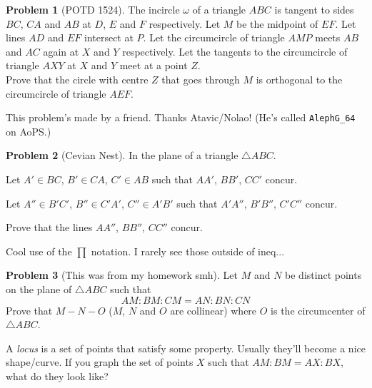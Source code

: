 \documentclass[11pt]{article} %
\theoremstyle{definition}
\newtheorem{problem}{Problem}
\theoremstyle{remark}
\begin{document}
\begin{problem}[POTD 1524]
    The incircle \(\omega\) of a triangle \(ABC\) is tangent to sides \(BC\), \(CA\) and \(AB\) at \(D\), \(E\) and \(F\) respectively. Let \(M\) be the midpoint of \(EF\). Let lines \(AD\) and \(EF\) intersect at \(P\). Let the circumcircle of triangle \(AMP\) meets \(AB\) and \(AC\) again at \(X\) and \(Y\) respectively. Let the tangents to the circumcircle of triangle \(AXY\) at \(X\) and \(Y\) meet at a point \(Z\).
    \\ Prove that the circle with centre \(Z\) that goes through \(M\) is orthogonal to the circumcircle of triangle \(AEF\).
    \begin{talks}
        \begin{talk}
            This problem's made by a friend. Thanks Atavic/Nolao! (He's called \verb|AlephG_64| on AoPS.)
        \end{talk}
    \end{talks}
\end{problem}

\begin{problem}[Cevian Nest]
    In the plane of a triangle \(\triangle ABC\).

    Let \(A' \in BC\), \(B' \in CA\), \(C' \in AB\) such that \(AA'\), \(BB'\), \(CC'\) concur.

    Let \(A'' \in B'C'\), \(B'' \in C'A'\), \(C'' \in A'B'\) such that \(A'A''\), \(B'B''\), \(C'C''\) concur.

    Prove that the lines \(AA''\), \(BB''\), \(CC''\) concur.
    \begin{talks}
        \begin{talk}
            Cool use of the \(\prod\) notation. I rarely see those outside of ineq...
        \end{talk}
    \end{talks}
\end{problem}

\begin{problem}[This was from my homework smh]
    Let \(M\) and \(N\) be distinct points on the plane of \(\triangle ABC\) such that
    \[AM : BM : CM = AN : BN : CN\]
    Prove that \(M - N - O\) (\(M\), \(N\) and \(O\) are collinear) where \(O\) is the circumcenter of \(\triangle ABC\).
    \begin{talks}
        \begin{talk}
            A \emph{locus} is a set of points that satisfy some property. Usually they'll become a nice shape/curve. If you graph the set of points \(X\) such that \(AM : BM = AX : BX\), what do they look like?
        \end{talk}
    \end{talks}
\end{problem}
\end{document}
